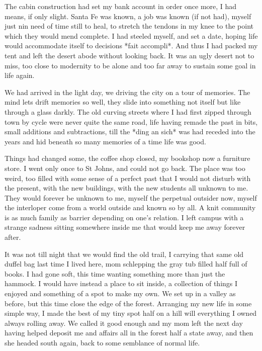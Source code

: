 \documentclass[ebook, 10pt, openright, onecolumn]{memoir}
\begin{document}
The cabin construction had set my bank account in order once more, I had means,
if only slight.  Santa Fe was known, a job was known (if not had), myself just
nin need of time still to heal, to stretch the tendons in my knee to the point
which they would mend complete. I had steeled myself, and set a date, hoping
life would accommodate itself to decisions *fait accompli*.  And thus I had
packed my tent and left the desert abode without looking back.  It was an ugly
desert not to miss, too close to modernity to be alone and too far away to
sustain some goal in life again.

We had arrived in the light day, we driving the city on a tour of memories.  The
mind lets drift memories so well, they slide into something not itself but like
through a glass darkly.  The old curving streets where I had first zipped
through town by cycle were never quite the same road, life having remade the
past in bits, small additions and subtractions, till the *ding an sich* was had
receded into the years and hid beneath so many memories of a time life was good.

Things had changed some, the coffee shop closed, my bookshop now a furniture
store. I went only once to St Johns, and could not go back.  The place was too
weird, too filled with some sense of a perfect past that I would not disturb
with the present, with the new buildings, with the new students all unknown to
me.  They would forever be unknown to me, myself the perpetual outsider now,
myself the interloper come from a world outside and known so by all.  A knit
community is as much family as barrier depending on one's relation.  I left
campus with a strange sadness sitting somewhere inside me that would keep me
away forever after.

It was not till night that we would find the old trail, I carrying that same old
duffel bag last time I lived here, mom schlepping the gray tub filled half full
of books.  I had gone soft, this time wanting something more than just the
hammock.  I would have instead a place to sit inside, a collection of things I
enjoyed and something of a spot to make my own.  We set up in a valley as
before, but this time close the edge of the forest.  Arranging my new life in
some simple way, I made the best of my tiny spot half on a hill will everything
I owned always rolling away.  We called it good enough and my mom left the next
day having helped deposit me and affairs all in the forest half a state away,
and then she headed south again, back to some semblance of normal life.  
\end{document}
